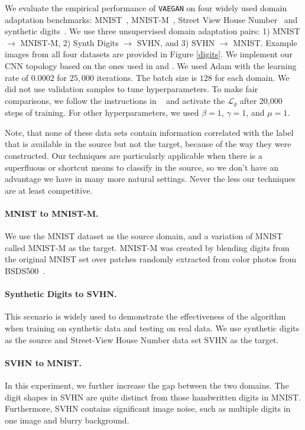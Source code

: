 \documentclass{article}
\begin{document}
We evaluate the empirical performance of \verb"VAEGAN" on four widely used domain adaptation benchmarks: MNIST~\cite{lecun1998gradient}, MNIST-M~\cite{ganin2016domain}, Street View House Number~\cite{netzer2011reading} and synthetic digits~\cite{ganin2016domain}. We use three unsupervised domain adaptation pairs: 1) MNIST $\rightarrow$ MNIST-M, 2) Synth Digits $\rightarrow$ SVHN, and 3) SVHN $\rightarrow$ MNIST. Example images from all four datasets are provided in Figure \ref{digits}.  We implement our CNN topology based on the ones used in \cite{bousmalis2016domain} and \cite{ganin2016domain}. We used Adam with the learning rate of $0.0002$ for $25,000$ iterations. The batch size is $128$ for each domain. We did not use validation samples to tune hyperparameters.  To make fair comparisons, we follow the instructions in ~\cite{bousmalis2016domain} and activate the $\mathcal{L}_g$ after 20,000 steps of training.  For other hyperparameters, we used $\beta =1$, $\gamma =1$, and $\mu=1$. 

Note, that none of these data sets contain information correlated with the label that is available in the source but not the target, because of the way they were constructed.  Our techniques are particularly applicable when there is a superfluous or shortcut means to classify in the source, so we don't have an advantage we have in many more natural settings.  Never the less our techniques are at least competitive.

\paragraph{MNIST to MNIST-M.} We use the MNIST dataset as the source domain, and a variation of MNIST called MNIST-M as the target. MNIST-M was created by blending digits from the original MNIST set over patches randomly extracted from color photos from BSDS500~\cite{arbelaez2010contour}. 

\paragraph{Synthetic Digits to SVHN.} This scenario is widely used to demonstrate the effectiveness of the algorithm when training on synthetic data and testing on real data. We use synthetic digits as the source and Street-View House Number data set SVHN as the target. 

\paragraph{SVHN to MNIST.} In this experiment, we further increase  the gap between the two domains.  The digit shapes in SVHN are quite distinct from those handwritten digits in MNIST. Furthermore, SVHN contains significant image noise, such as multiple digits in one image and blurry background. 
\end{document}
